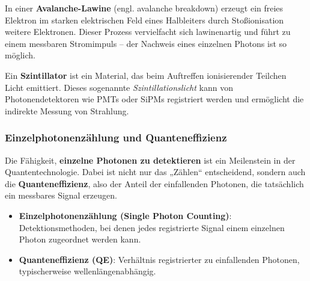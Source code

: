 \begin{tcolorbox}[didaktikbox, title=Begriffserklärung: Avalanche-Lawine]
	\label{box:avalanche}
	\small
	In einer \textbf{Avalanche-Lawine} (engl. avalanche breakdown) erzeugt ein freies Elektron im starken elektrischen Feld eines Halbleiters durch Stoßionisation weitere Elektronen. Dieser Prozess vervielfacht sich lawinenartig und führt zu einem messbaren Stromimpuls – der Nachweis eines einzelnen Photons ist so möglich.
\end{tcolorbox}
\vspace{1em}
\begin{tcolorbox}[didaktikbox, title=Begriffserklärung: Szintillator]
	\label{box:szintillator}
	\small
	Ein \textbf{Szintillator} ist ein Material, das beim Auftreffen ionisierender Teilchen Licht emittiert. Dieses sogenannte \emph{Szintillationslicht} kann von Photonendetektoren wie PMTs oder SiPMs registriert werden und ermöglicht die indirekte Messung von Strahlung.
\end{tcolorbox}

\subsubsection{Einzelphotonenzählung und Quanteneffizienz}

Die Fähigkeit, \textbf{einzelne Photonen zu detektieren} ist ein Meilenstein in der Quantentechnologie. Dabei ist nicht nur das „Zählen“ entscheidend, sondern auch die \textbf{Quanteneffizienz}, also der Anteil der einfallenden Photonen, die tatsächlich ein messbares Signal erzeugen.
\vspace{1em}
\begin{tcolorbox}[physikbox, title=Physikalische Begriffe]
	\label{box:begriffe}
	\small
	\begin{itemize}
		\item \textbf{Einzelphotonenzählung (Single Photon Counting)}: Detektionsmethoden, bei denen jedes registrierte Signal einem einzelnen Photon zugeordnet werden kann.
		\item \textbf{Quanteneffizienz (QE)}: Verhältnis registrierter zu einfallenden Photonen, typischerweise wellenlängenabhängig.
	\end{itemize}
\end{tcolorbox}

